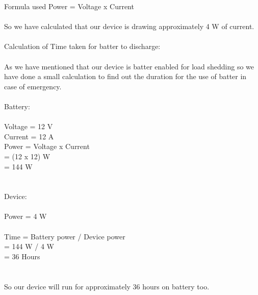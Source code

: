 Formula used Power = Voltage x Current
\\
\\
So we have calculated that our device is drawing approximately 4 W of current.
\\
\\
Calculation of Time taken for batter to discharge:
\\
\\
As we have mentioned that our device is batter enabled for load shedding so we have done a small calculation to find out the duration for the use of batter in case of emergency.
\\
\\
Battery:
\\
\\ 
	Voltage = 12 V\\
	Current = 12 A\\
	Power = Voltage x Current \\
		= (12 x 12) W\\
		= 144 W\\
\\
\\
Device:
\\
\\
	Power = 4 W
\\
\\
Time = Battery power / Device power\\
	= 144 W / 4 W\\
	= 36 Hours \\
\\
\\
So our device will run for approximately 36 hours on battery too.

